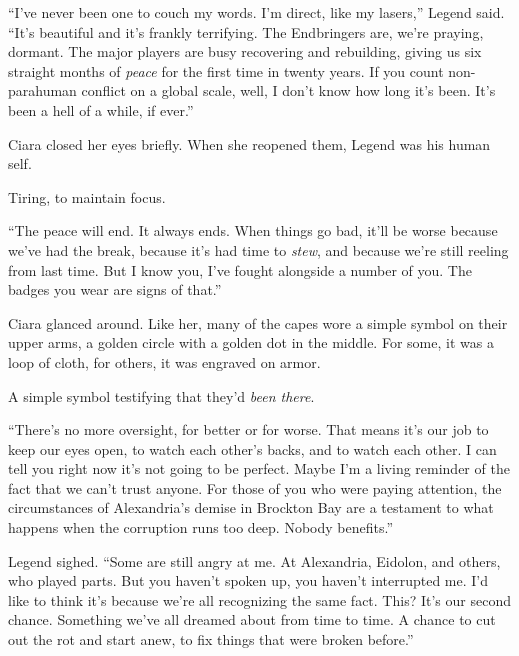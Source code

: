 ``I've never been one to couch my words.  I'm direct, like my lasers,'' Legend said.  ``It's beautiful and it's frankly terrifying.  The Endbringers are, we're praying, dormant.  The major players are busy recovering and rebuilding, giving us six straight months of \emph{peace} for the first time in twenty years.  If you count non-parahuman conflict on a global scale, well, I don't know how long it's been.  It's been a hell of a while, if ever.''



Ciara closed her eyes briefly.  When she reopened them, Legend was his human self.



Tiring, to maintain focus.



``The peace will end.  It always ends.  When things go bad, it'll be worse because we've had the break, because it's had time to \emph{stew}, and because we're still reeling from last time.  But I know you, I've fought alongside a number of you.  The badges you wear are signs of that.''



Ciara glanced around.  Like her, many of the capes wore a simple symbol on their upper arms, a golden circle with a golden dot in the middle.  For some, it was a loop of cloth, for others, it was engraved on armor.



A simple symbol testifying that they'd \emph{been there}.



``There's no more oversight, for better or for worse.  That means it's our job to keep our eyes open, to watch each other's backs, and to watch each other.  I can tell you right now it's not going to be perfect.  Maybe I'm a living reminder of the fact that we can't trust anyone.  For those of you who were paying attention, the circumstances of Alexandria's demise in Brockton Bay are a testament to what happens when the corruption runs too deep.  Nobody benefits.''



Legend sighed.  ``Some are still angry at me.  At Alexandria, Eidolon, and others, who played parts.  But you haven't spoken up, you haven't interrupted me.  I'd like to think it's because we're all recognizing the same fact.  This?  It's our second chance.  Something we've all dreamed about from time to time.  A chance to cut out the rot and start anew, to fix things that were broken before.''



